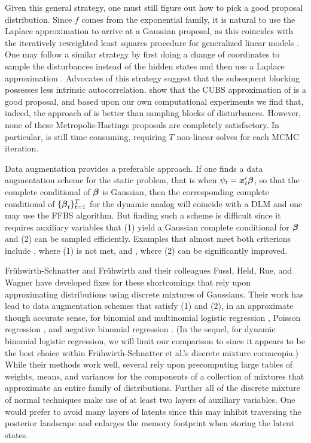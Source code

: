 \npoint Given this general strategy, one must still figure out how to pick a
good proposal distribution.  Since $f$ comes from the exponential family, it is
natural to use the Laplace approximation to arrive at a Gaussian proposal, as
this coincides with the iteratively reweighted least squares procedure for
generalized linear models \citep{gamerman-1997}.  One may follow a similar
strategy by first doing a change of coordinates to sample the disturbances
instead of the hidden states and then use a Laplace approximation
\citep{shephard-pitt-1997, gamerman-1998}.  Advocates of this strategy suggest
that the subsequent blocking possesses less intrinsic autocorrelation.
\citet{migon-etal-2013} show that the CUBS approximation of \citet{west-etal-1985}
is a good proposal, and based upon our own computational experiments we find
that, indeed, the approach of \citet{migon-etal-2013} is better than sampling
blocks of disturbances.  However, none of these Metropolis-Hastings proposals
are completely satisfactory.  In particular, \citet{migon-etal-2013} is still
time consuming, requiring $T$ non-linear solves for each MCMC iteration.

\npoint Data augmentation provides a preferable approach.  If one finds a data
augmentation scheme for the static problem, that is when $\psi_t = \boldsymbol{x}_t'
\boldsymbol{\beta}$, so that the complete conditional of $\boldsymbol{\beta}$ is Gaussian, then the
corresponding complete conditional of $\{\boldsymbol{\beta}_t\}_{t=1}^T$ for the dynamic
analog will coincide with a DLM and one may use the FFBS algorithm.
\npoint But finding such a scheme is difficult since it requires auxiliary
variables that (1) yield a Gaussian complete conditional for $\boldsymbol{\beta}$ and (2)
can be sampled efficiently.  Examples that almost meet both criterions include
\citet{mcfadden-1974}, where (1) is not met, and \citet{holmes-held-2006}, where
(2) can be significantly improved.

\npoint Fr\"{u}hwirth-Schnatter and Fr\"{u}hwirth and their colleagues Fussl,
Held, Rue, and Wagner have developed fixes for these shortcomings that rely upon
approximating distributions using discrete mixtures of Gaussians.  Their work
has lead to data augmentation schemes that satisfy (1) and (2), in an
approximate though accurate sense, for binomial and multinomial logistic
regression \citep{fruhwirth-schnatter-fruhwirth-2007,
  fruhwirth-schnatter-fruhwirth-2010, fussl-etal-2013}, Poisson regression
\citep{fruhwirth-schnatter-wagner-2006, fruhwirth-schnatter-etal-2009}, and
negative binomial regression \citep{fruhwirth-schnatter-etal-2009}.  (In the
sequel, for dynamic binomial logistic regression, we will limit our comparison
to \citet{fussl-etal-2013} since it appears to be the best choice within
Fr\"{u}hwirth-Schnatter et al.'s discrete mixture cornucopia.)
\npoint While their methods work well, several rely upon precomputing large
tables of weights, means, and variances for the components of a collection of
mixtures that approximate an entire family of distributions.  Further all of the
discrete mixture of normal techniques make use of at least two layers of
auxiliary variables.  One would prefer to avoid many layers of latents since
this may inhibit traversing the posterior landscape and enlarges the memory
footprint when storing the latent states.


